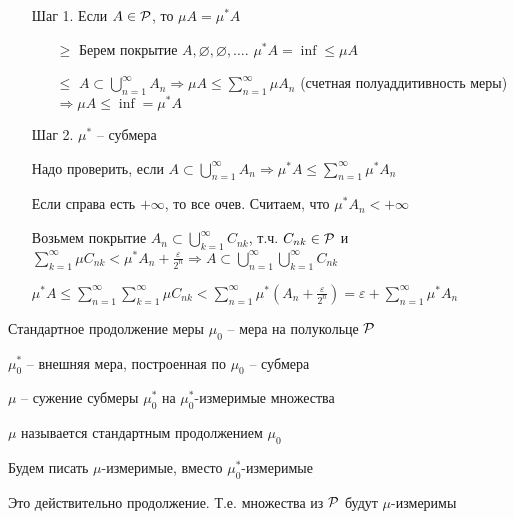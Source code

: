\documentclass[12pt]{article}
\begin{document}
\begin{itemize}
    \item[Шаг 1.] Если $A \in \P$, то $\mu A = \mu^* A$
    
    \begin{itemize}
        \item[$\geq$] Берем покрытие $A, \varnothing, \varnothing, \ldots$. $\mu^* A = \inf \leq \mu A$
        \item[$\leq$] $A \subset \bigcup\limits_{n = 1}^\infty A_n \Rightarrow \mu A \leq \sum\limits_{n = 1}^\infty \mu A_n$ (счетная полуаддитивность меры) $\Rightarrow \mu A \leq \inf = \mu^* A$
    \end{itemize}

    \item[Шаг 2.] $\mu^*$ -- субмера 
    
    Надо проверить, если $A \subset \bigcup\limits_{n = 1}^\infty A_n \Rightarrow \mu^* A \leq \sum\limits_{n = 1}^\infty \mu^* A_n$

    Если справа есть $+ \infty$, то все очев. Считаем, что $\mu^* A_n < + \infty$

    Возьмем покрытие $A_n \subset \bigcup\limits_{k = 1}^\infty C_{nk}$, т.ч. $C_{nk} \in \P$ и $\sum\limits_{k = 1}^\infty \mu C_{nk} < \mu^* A_n + \frac{\varepsilon}{2^n} \Rightarrow A \subset \bigcup\limits_{n = 1}^\infty \bigcup\limits_{k = 1}^\infty C_{nk}$

    $\mu^* A \leq \sum\limits_{n = 1}^\infty \sum\limits_{k = 1}^\infty \mu C_{nk} < \sum\limits_{n = 1}^\infty \mu^* (A_n + \frac{\varepsilon}{2^n}) = \varepsilon + \sum\limits_{n = 1}^\infty \mu^* A_n$
\end{itemize}

\begin{defin}{Стандартное продолжение меры}
    $\mu_0$ -- мера на полукольце $\P$

    $\mu_0^*$ -- внешняя мера, построенная по $\mu_0$ -- субмера 

    $\mu$ -- сужение субмеры $\mu_0^*$ на $\mu_0^*$-измеримые множества 

    $\mu$ называется стандартным продолжением $\mu_0$
\end{defin}

\begin{declar}{}
    Будем писать $\mu$-измеримые, вместо $\mu_0^*$-измеримые 
\end{declar}

\begin{theo}{}
    Это действительно продолжение. Т.е. множества из $\P$ будут $\mu$-измеримы
\end{theo}
\end{document}
